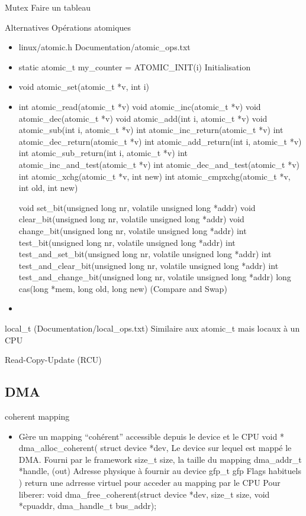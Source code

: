 \begin{frame}{Mutex}
Faire un tableau
\begin{frame}{Alternatives}
  Opérations atomiques
  \begin{itemize}
  \item linux/atomic.h Documentation/atomic_ops.txt
  \item static atomic_t my_counter = ATOMIC_INIT(i) Initialisation
  \item void atomic_set(atomic_t *v, int i)
  \item int atomic_read(atomic_t *v)
        void atomic_inc(atomic_t *v)
        void atomic_dec(atomic_t *v)
        void atomic_add(int i, atomic_t *v)
        void atomic_sub(int i, atomic_t *v)
        int atomic_inc_return(atomic_t *v)
        int atomic_dec_return(atomic_t *v)
        int atomic_add_return(int i, atomic_t *v)
        int atomic_sub_return(int i, atomic_t *v)
        int atomic_inc_and_test(atomic_t *v)
        int atomic_dec_and_test(atomic_t *v)
        int atomic_xchg(atomic_t *v, int new)
        int atomic_cmpxchg(atomic_t *v, int old, int new)


        void set_bit(unsigned long nr, volatile unsigned long *addr)
        void clear_bit(unsigned long nr, volatile unsigned long *addr)
        void change_bit(unsigned long nr, volatile unsigned long *addr)
        int test_bit(unsigned long nr, volatile unsigned long *addr)
        int test_and_set_bit(unsigned long nr, volatile unsigned long *addr)
        int test_and_clear_bit(unsigned long nr, volatile unsigned long *addr)
        int test_and_change_bit(unsigned long nr, volatile unsigned long *addr)
        long cas(long *mem, long old, long new) (Compare and Swap)

  \item 
  \end{itemize} 
local_t (Documentation/local_ops.txt) Similaire aux atomic_t mais locaux à un CPU

 Read-Copy-Update (RCU)
\end{frame} 
\subsection{DMA}
\begin{frame}{coherent mapping}
\begin{itemize} 
\item Gère un mapping ``cohérent'' accessible depuis le device et le CPU
void * dma_alloc_coherent(
   struct device *dev,  Le device sur lequel est mappé le DMA. Fourni par le framework 
  size_t size, la taille du mapping
  dma_addr_t *handle, (out) Adresse physique à fournir au device
  gfp_t gfp Flags habituels
) return une adrresse virtuel pour acceder au mapping par le CPU
Pour liberer:
void dma_free_coherent(struct device *dev, size_t size, void *cpuaddr,
dma_handle_t bus_addr);
\end{itemize} 
\end{frame} 


\end{frame}
